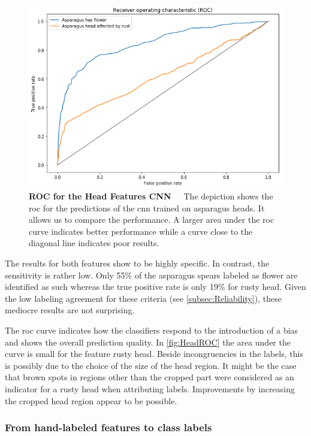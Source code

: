 \begin{figure}[!t]
	\centering
	\vspace{2cm}
	\includegraphics[scale=1.55]{Figures/chapter04/head_roc.png}
	\decoRule
	\caption[Head Features CNN ROC Curve]{\textbf{ROC for the Head Features CNN}~~~The depiction shows the \acrfull{roc} for the predictions of the \acrshort{cnn} trained on asparagus heads. It allows us to compare the performance. A larger area under the \acrshort{roc} curve indicates better performance while a curve close to the diagonal line indicates poor results.}
	\label{fig:HeadROC}
\end{figure}

\bigskip
The results for both features show to be highly specific. In contrast, the sensitivity is rather low. Only 55\% of the asparagus spears labeled as flower are identified as such whereas the true positive rate is only 19\% for rusty head. Given the low labeling agreement for these criteria (see \autoref{subsec:Reliability}), these mediocre results are not surprising.

The \acrshort{roc} curve indicates how the classifiers respond to the introduction of a bias and shows the overall prediction quality. In \autoref{fig:HeadROC} the area under the curve is small for the feature rusty head. Beside incongruencies in the labels, this is possibly due to the choice of the size of the head region. It might be the case that brown spots in regions other than the cropped part were considered as an indicator for a rusty head when attributing labels. Improvements by increasing the cropped head region appear to be possible.


\subsubsection{From hand-labeled features to class labels}
\label{subsec:FeaturesToLabels}

